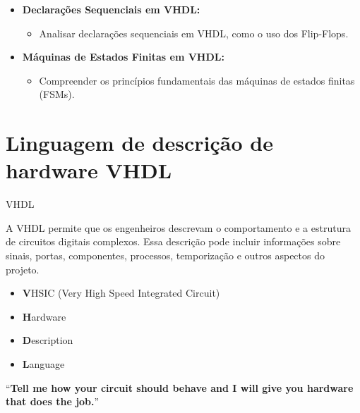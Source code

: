 \documentclass[aspectratio=169]{beamer}
\begin{document}
\begin{frame}
\begin{itemize}
		\item \textbf{Declarações Sequenciais em VHDL:}
		\begin{itemize}
			\justifying
			\item Analisar declarações sequenciais em VHDL, como o uso dos Flip-Flops.
		\end{itemize}
		
		\item \textbf{Máquinas de Estados Finitas em VHDL:}
		\begin{itemize}
			\justifying
			\item Compreender os princípios fundamentais das máquinas de estados finitas (FSMs).
		\end{itemize}	
		
	\end{itemize}
\end{frame}
\section{Linguagem de descrição de hardware VHDL}
\begin{frame}{VHDL}
	\justifying
	
	\begin{block}{}
		\justifying
		A VHDL permite que os engenheiros descrevam o comportamento e a estrutura de circuitos digitais complexos. Essa descrição pode incluir informações sobre sinais, portas, componentes, processos, temporização e outros aspectos do projeto.
	\end{block}
	
	\begin{itemize}
		\item \textbf{V}HSIC (Very High Speed Integrated Circuit)
		\item \textbf{H}ardware
		\item \textbf{D}escription
		\item \textbf{L}anguage
	\end{itemize}
	
\begin{alertblock}{}
``\textbf{Tell me how your circuit should behave and I will give you
hardware that does the job.}”
\end{alertblock}	
	
	
\end{frame}
\end{document}
